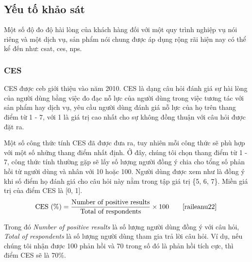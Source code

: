 \subsection{Yếu tố khảo sát}
Một số độ đo độ hài lòng của khách hàng đối với một quy trình nghiệp vụ nói riêng và một dịch vụ, sản phẩm nói chung được áp dụng rộng rãi hiện nay có thể kể đến như: \acrfull*{csat}, \acrfull*{ces}, \acrfull*{nps}.

\subsubsection{CES}

CES được \acrfull*{ceb} giới thiệu vào năm 2010. CES là dạng câu hỏi đánh giá sự hài lòng của người dùng bằng việc đo đạc nỗ lực của người dùng trong việc tương tác với sản phẩm hay dịch vụ, yêu cầu người dùng đánh giá nỗ lực của họ trên thang điểm từ 1 - 7, với 1 là giá trị cao nhất cho sự không đồng thuận với câu hỏi được đặt ra. 
\par
Một số công thức tính CES đã được đưa ra, tuy nhiên mỗi công thức sẽ phù hợp với một số những thang điểm nhất định. Ở đây, chúng tôi chọn thang điểm từ 1 - 7, công thức tính thường gặp sẽ lấy số lượng người đồng ý chia cho tổng số phản hồi từ người dùng và nhân với 10 hoặc 100. Người dùng được xem như là đồng ý khi số điểm họ đánh giá cho câu hỏi này nằm trong tập giá trị \{5, 6, 7\}. Miền giá trị của điểm CES là [0, 1].
\[ \text{CES (\%)} = \frac{\text{Number of positive results}}{\text{Total of respondents}} \times 100 \tag*{\cite{raileanu22}}\]
\par
Trong đó \emph{Number of positive results} là số lượng người dùng đồng ý với câu hỏi, \emph{Total of respondents} là số lượng người dùng tham gia trả lời câu hỏi. Ví dụ, nếu chúng tôi nhận được 100 phản hồi và 70 trong số đó là phản hồi tích cực, thì điểm CES sẽ là 70\%.


